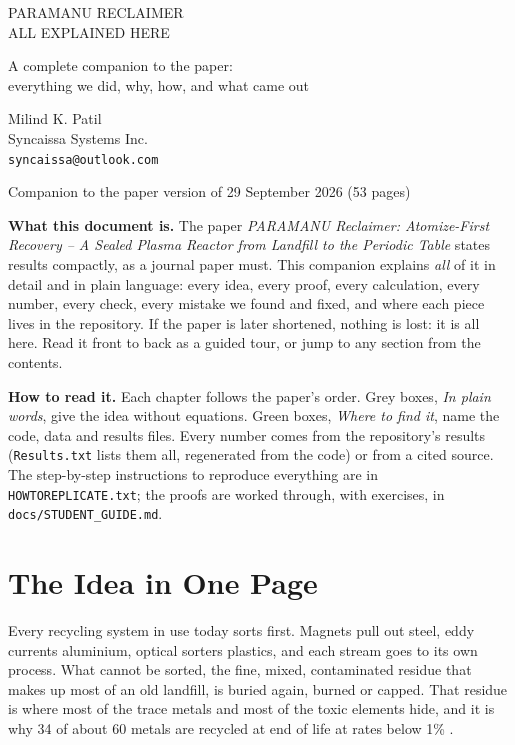 \documentclass[11pt,a4paper]{article}
\begin{document}
\thispagestyle{plain}

\begin{ptitle}
PARAMANU RECLAIMER\\[4pt] ALL EXPLAINED HERE
\end{ptitle}

\begin{psubtitle}
A complete companion to the paper:\\
everything we did, why, how, and what came out
\end{psubtitle}

\begin{pauthor}
Milind K. Patil\\
Syncaissa Systems Inc.\\
\texttt{syncaissa@outlook.com}
\end{pauthor}

\begin{pdate}
Companion to the paper version of 29 September 2026 (53 pages)
\end{pdate}

\begin{keyinsight}
\textbf{What this document is.} The paper \emph{PARAMANU Reclaimer: Atomize-First Recovery -- A Sealed Plasma Reactor from Landfill to the Periodic Table} states results compactly, as a journal paper must. This companion explains \emph{all} of it in detail and in plain language: every idea, every proof, every calculation, every number, every check, every mistake we found and fixed, and where each piece lives in the repository. If the paper is later shortened, nothing is lost: it is all here. Read it front to back as a guided tour, or jump to any section from the contents.
\end{keyinsight}

\bigskip
\noindent\textbf{How to read it.} Each chapter follows the paper's order. Grey boxes, \emph{In plain words}, give the idea without equations. Green boxes, \emph{Where to find it}, name the code, data and results files. Every number comes from the repository's results (\texttt{Results.txt} lists them all, regenerated from the code) or from a cited source. The step-by-step instructions to reproduce everything are in \texttt{HOWTOREPLICATE.txt}; the proofs are worked through, with exercises, in \texttt{docs/STUDENT\_GUIDE.md}.

\newpage
\tableofcontents
\newpage

\section{The Idea in One Page}
Every recycling system in use today sorts first. Magnets pull out steel, eddy currents aluminium, optical sorters plastics, and each stream goes to its own process. What cannot be sorted, the fine, mixed, contaminated residue that makes up most of an old landfill, is buried again, burned or capped. That residue is where most of the trace metals and most of the toxic elements hide, and it is why 34 of about 60 metals are recycled at end of life at rates below 1\% \citep{graedel2011}.
\end{document}
